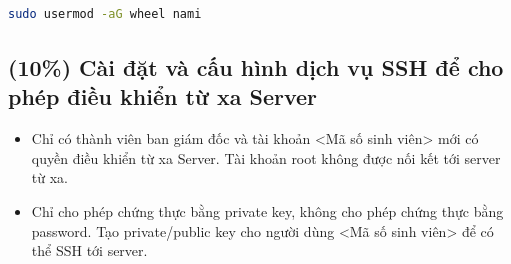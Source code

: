 \documentclass[a4paper, 11pt]{article}
\begin{document}
\begin{lstlisting}[language=bash, caption=Cấp quyền sudo cho user nami]
sudo usermod -aG wheel nami
\end{lstlisting}

\subsection{(10\%)  Cài đặt và cấu hình dịch vụ SSH để cho phép điều khiển từ xa Server}

\begin{itemize}
    \item Chỉ có thành viên ban giám đốc và tài khoản <Mã số sinh viên> mới có quyền điều khiển từ xa Server. Tài khoản root không được nối kết tới server từ xa.
    \item Chỉ cho phép chứng thực bằng private key, không cho phép chứng thực bằng password. Tạo private/public key cho người dùng <Mã số sinh viên> để có thể SSH tới server.
\end{itemize}
\end{document}
